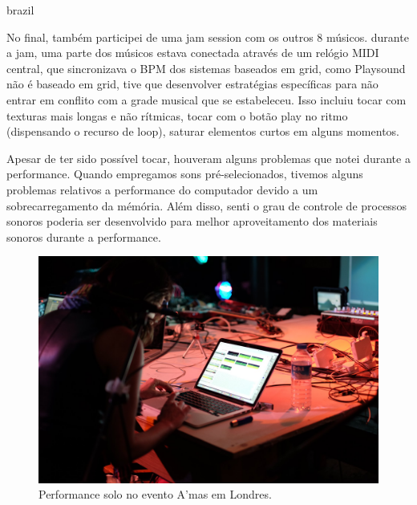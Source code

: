 \begin{otherlanguage*}{brazil}
\begin{description}
No final, também participei de uma jam session com os outros 8 músicos. durante a jam, uma parte dos músicos estava conectada através de um relógio MIDI central, que sincronizava o BPM dos sistemas baseados em grid, como Playsound não é baseado em grid, tive que desenvolver estratégias específicas para não entrar em conflito com a grade musical que se estabeleceu. Isso incluiu tocar com texturas mais longas e não rítmicas, tocar com o botão play no ritmo (dispensando o recurso de loop), saturar elementos curtos em alguns momentos.

Apesar de ter sido possível tocar, houveram alguns problemas que notei durante a performance. Quando empregamos sons pré-selecionados, tivemos alguns problemas relativos a performance do computador devido a um sobrecarregamento da mémória. Além disso, senti o grau de controle de processos sonoros poderia ser desenvolvido para melhor aproveitamento dos materiais sonoros durante a performance.

\begin{figure}
\centering
\includegraphics[width=1\textwidth]{pictures/cap4/ariane_amas}
\caption{\label{amas}Performance solo no evento A'mas em Londres.}
\label{fig:amas}
\end{figure}


\end{description}






\end{otherlanguage*}
